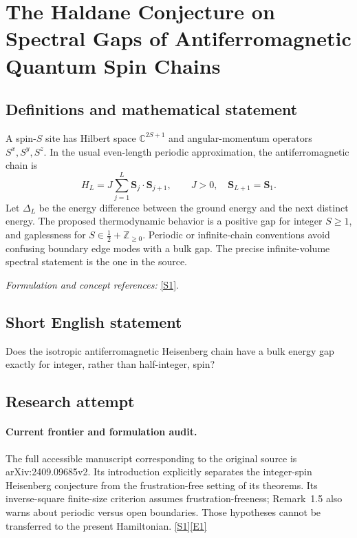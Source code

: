 \documentclass[11pt,a4paper]{article}
\newcommand{\Z}{\mathbb{Z}}
\newcommand{\C}{\mathbb{C}}
\newcommand{\sref}[2]{\hyperlink{source:#1:#2}{[S#2]}}
\newcommand{\eref}[2]{\hyperlink{extra:#1:#2}{[E#2]}}
\newif\ifshowcatalogue
\newcommand{\cataloguescope}[1]{\ifshowcatalogue
 \paragraph{Exact scope in the supplied catalogue.}
 \begin{quote}\small #1\end{quote}\fi}
\numberwithin{equation}{section}
\begin{document}
\setcounter{section}{110}
\clearpage
\section{\texorpdfstring{The Haldane Conjecture on Spectral Gaps of Antiferromagnetic Quantum Spin Chains}{The Haldane Conjecture on Spectral Gaps of Antiferromagnetic Quantum Spin Chains}}\label{111}
\subsection{Definitions and mathematical statement}
A spin-$S$ site has Hilbert space $\C^{2S+1}$ and angular-momentum operators $S^x,S^y,S^z$. In the usual even-length periodic approximation, the antiferromagnetic chain is
\[
 H_L=J\sum_{j=1}^{L}\mathbf S_j\cdot\mathbf S_{j+1},\qquad J>0,\quad\mathbf S_{L+1}=\mathbf S_1.
\]
Let $\Delta_L$ be the energy difference between the ground energy and the next distinct energy. The proposed thermodynamic behavior is a positive gap for integer $S\ge1$, and gaplessness for $S\in\tfrac12+\Z_{\ge0}$. Periodic or infinite-chain conventions avoid confusing boundary edge modes with a bulk gap. The precise infinite-volume spectral statement is the one in the source.
\par\smallskip\textit{Formulation and concept references:} \sref{111}{1}.
\cataloguescope{Prove that the one-dimensional isotropic antiferromagnetic Heisenberg chain has a positive spectral gap for every integer spin S >= 1 and is gapless for every half-integer spin.}
\subsection{Short English statement}
Does the isotropic antiferromagnetic Heisenberg chain have a bulk energy gap exactly for integer, rather than half-integer, spin?
\subsection{Research attempt}

\paragraph{Current frontier and formulation audit.}
The full accessible manuscript corresponding to the original source is
arXiv:2409.09685v2. Its introduction explicitly separates the integer-spin
Heisenberg conjecture from the frustration-free setting of its theorems.
Its inverse-square finite-size criterion assumes frustration-freeness;
Remark~1.5 also warns about periodic versus open boundaries. Those hypotheses
cannot be transferred to the present Hamiltonian. \sref{111}{1}\eref{111}{1}
\end{document}
